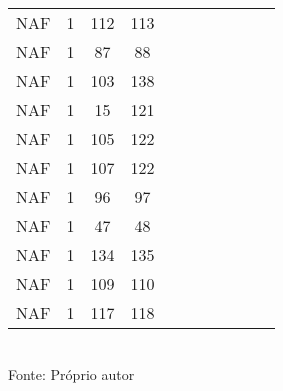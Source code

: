 \begin{table}[H]
{\begin{tabular}{ccccccccccc}
NAF & 1 & 112 & 113 &  &  &  &  &  &  &  \\
NAF & 1 & 87 & 88 &  &  &  &  &  &  &  \\
NAF & 1 & 103 & 138 &  &  &  &  &  &  &  \\
NAF & 1 & 15 & 121 &  &  &  &  &  &  &  \\
NAF & 1 & 105 & 122 &  &  &  &  &  &  &  \\
NAF & 1 & 107 & 122 &  &  &  &  &  &  &  \\
NAF & 1 & 96 & 97 &  &  &  &  &  &  &  \\
NAF & 1 & 47 & 48 &  &  &  &  &  &  &  \\
NAF & 1 & 134 & 135 &  &  &  &  &  &  &  \\
NAF & 1 & 109 & 110 &  &  &  &  &  &  &  \\
NAF & 1 & 117 & 118 &  &  &  &  &  &  &  \\
\bottomrule
\end{tabular}}
\\Fonte: Próprio autor
\end{table}


